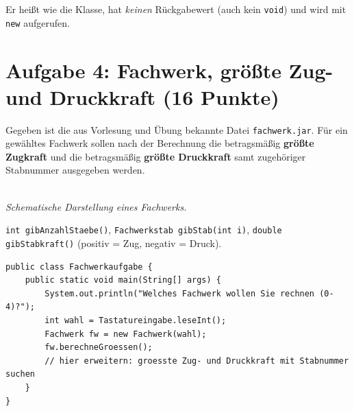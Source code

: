 \documentclass[
	fontsize=12pt,
	paper=a4,
	numbers=noenddot,
	parskip=half,
	openany
]{scrbook}
\begin{document}
\begin{hinweis}
	Er heißt wie die Klasse, hat \emph{keinen} Rückgabewert (auch kein \texttt{void}) und wird mit \texttt{new} aufgerufen.
\end{hinweis}

\clearpage
\section*{Aufgabe 4: Fachwerk, größte Zug- und Druckkraft \hfill (16 Punkte)}

Gegeben ist die aus Vorlesung und Übung bekannte Datei \texttt{fachwerk.jar}. Für ein gewähltes Fachwerk sollen nach der Berechnung die betragsmäßig \textbf{größte Zugkraft} und die betragsmäßig \textbf{größte Druckkraft} samt zugehöriger Stabnummer ausgegeben werden.

\begin{center}
\\[-0.3em]
{\footnotesize\itshape Schematische Darstellung eines Fachwerks.}
\end{center}

\begin{hinweis}
	\texttt{int gibAnzahlStaebe()}, \texttt{Fachwerkstab gibStab(int i)}, \texttt{double gibStabkraft()} (positiv = Zug, negativ = Druck).
\end{hinweis}

\begin{lstlisting}
public class Fachwerkaufgabe {
    public static void main(String[] args) {
        System.out.println("Welches Fachwerk wollen Sie rechnen (0-4)?");
        int wahl = Tastatureingabe.leseInt();
        Fachwerk fw = new Fachwerk(wahl);
        fw.berechneGroessen();
        // hier erweitern: groesste Zug- und Druckkraft mit Stabnummer suchen
    }
}
\end{lstlisting}
\end{document}

